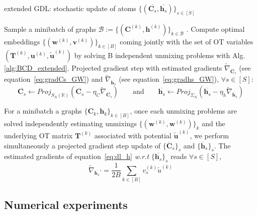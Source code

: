 \documentclass{article}
\def\eqref#1{equation~\ref{#1}}
\def\vh{{\bm{h}}}
\def\vu{{\bm{u}}}
\def\vv{{\bm{v}}}
\def\vw{{\bm{w}}}
\def\mC{{\bm{C}}}
\def\mT{{\bm{T}}}
\newcommand{\R}{\mathbb{R}}
\def\R{{\mathbb{R}}}
\begin{document}
	\begin{algorithm}[h]
		\caption{extended GDL: stochastic update of atoms $\{(\overline{\mC_s},\overline{\vh_s})\}_{s\in [S]}$}
		\label{alg:GW_extended}
		\begin{algorithmic}[1]
			\STATE Sample a minibatch of graphs $\mathcal{B} :=\{(\mC^{(k)},\vh^{(k)})\}_{k \in \mathcal{B}}$ .
			\STATE Compute optimal embeddings $\{(\vw^{(k)},\vv^{(k)})\}_{k \in [B]}$ coming jointly with the set of OT variables $(\mT^{(k)},\vu^{(k)}, \widetilde{\vu}^{(k)})$ by solving B independent unmixing problems with Alg.\ref{alg:BCD_extended}. 
			\STATE Projected gradient step with estimated gradients $\widetilde{\nabla}_{\overline{\mC_s}}$ (see \eqref{eq:gradCs_GW}) and $\widetilde{\nabla}_{\overline{\vh_s}}$ (see \eqref{eq:gradhs_GW}), $\forall s \in [S]$: \vspace{-2mm}
			\begin{equation}
			\overline{\mC_s} \leftarrow Proj_{S_N(\R)}( \overline{\mC_s} - \eta_C \widetilde{\nabla}_{\overline{\mC_s}} ) \qquad \text{and} \qquad \overline{\vh_s} \leftarrow Proj_{\Sigma_N}( \overline{\vh_s} - \eta_h \widetilde{\nabla}_{\overline{\vh_s}} )
			\end{equation}
		\end{algorithmic}
	\end{algorithm}
	For a minibatch a graphs $\{\mC_k,\vh_k\}_{k \in [B]}$, once each unmixing problems are solved independently estimating unmixings $\{(\vw^{(k)}, \vw^{(k)})\}_k$ and the underlying OT matrix $\mT^{(k)}$ associated with potential $\widetilde{\vu}^{(k)}$, we perform simultaneously a projected gradient step
	update of $\{\overline{\mC}_s\}_s$ and $\{\overline{\vh}_s\}_s$. The estimated gradients of \eqref{eq:dl_h} \emph{w.r.t} $\{\overline{\vh_s} \}_s$ reads $\forall s \in [S]$,
	\begin{equation}\label{eq:gradhs_GW}
	\widetilde{\nabla}_{\overline{\vh_s}} \cdot = \frac{1}{2B} \sum_{k\in [B]}v^{(k)}_s \widetilde{u}^{(k)}
	\end{equation}
	
	\subsection{Numerical experiments}
	
\end{document}
